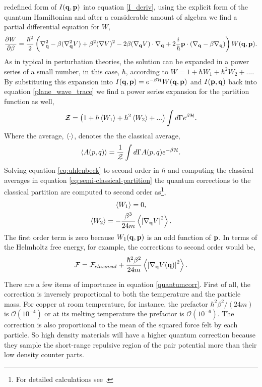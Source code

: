 redefined form of $I(\mathbf{q}, \mathbf{p})$ into equation \ref{I_deriv}, using the explicit
form of the quantum Hamiltonian and after a considerable amount of algebra we
find a partial differential equation for $W$,
%
\begin{equation} 
    \label{eq:uhlenbeck} 
    \frac{\partial W}{\partial \beta} = \frac{\hbar^2}{2} \left(
        \nabla_{\mathbf{q}}^2 
        - \beta(\nabla_{\mathbf{q}}^2V)
        + \beta^2(\nabla V)^2 
        - 2\beta(\nabla_{\mathbf{q}} V)\cdot\nabla_{\mathbf{q}}
        + 2 \frac{i}{\hbar}\mathbf{p}\cdot(\nabla_{\mathbf{q}} -\beta\nabla_{\mathbf{q}}) 
    \right)W(\mathbf{q}, \mathbf{p}).
\end{equation}
%
As in typical in perturbation theories, the solution can be expanded in a power
series of a small number, in this case, $\hbar$, according to $W = 1 + \hbar
W_1 + \hbar^2 W_2 + ...$. By substituting  this expansion into $I(\mathbf{q}, \mathbf{p}) =
e^{-\beta\mathcal{H}}W(\mathbf{q}, \mathbf{p})$  and $I(\mathbf{p},\mathbf{q})$  back into equation
\ref{plane_wave_trace} we find a power series expansion for the partition
function as well,
%
\begin{equation}
    \label{eq:semi-classical-partition}
    \mathcal{Z} = \left(1 + \hbar \left\langle W_1 \right\rangle + \hbar^2 \left\langle W_2 \right\rangle+ ...\right)
        \int d\Gamma e^{\beta\mathcal{H}}.
\end{equation}
%
Where the average, $\left\langle \cdot \right\rangle$, denotes the the classical average, 
%
\begin{equation} \langle A(p, q) \rangle = \frac{1}{\mathcal{Z}} \int d\Gamma A(p, q)
e^{-\beta \mathcal{H}}.  \end{equation}
%
Solving equation \ref{eq:uhlenbeck} to second order in $\hbar$ and computing
the classical averages in equation \ref{eq:semi-classical-partition} the
quantum corrections to the classical partition are computed to second 
order as\footnote{For detailed calculations see \cite{LANDAU198079}.},
%
\begin{gather}
    \left\langle W_1 \right\rangle= 0, \\
    \left\langle W_2 \right\rangle = - \frac{\beta^3}{24 m} \left\langle \left\vert\nabla_{\mathbf{q}} V \right\vert^2 \right\rangle.
\end{gather}
%
The first order term is zero because $W_1(\mathbf{q}, \mathbf{p})$ is an odd function of $\mathbf{p}$.
In terms of the Helmholtz free energy, for example, the corrections to second
order would be, 
%
\begin{equation}
    \label{quantumcorr}
    \mathcal{F} = \mathcal{F}_{classical} + \frac{\hbar^2\beta^2}{24m}
        \left\langle  \left\vert \nabla_{\mathbf{q}} V(\mathbf{q}) \right\vert^2  \right\rangle.
\end{equation}

There are a few items of importance in equation \ref{quantumcorr}. First of
all, the correction is inversely proportional to both the temperature and the
particle mass.  For copper at room temperature, for instance, the prefactor
$\hbar^2\beta^2/(24 m)$ is $\mathcal{O}(10^{-4})$ or at its melting temperature
the prefactor is $\mathcal{O}(10^{-6})$.  The correction is also proportional
to the mean of the squared force felt by each particle. So high density
materials will have a higher quantum correction because they sample the
short-range repulsive region of the pair potential more than their low density
counter parts.

